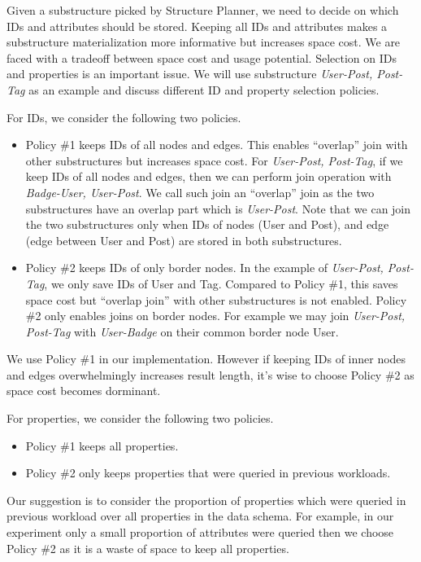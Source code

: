 Given a substructure picked by Structure Planner, we need to decide on which IDs and attributes should be stored. Keeping all IDs and attributes makes a substructure materialization more informative but increases space cost. We are faced with a tradeoff between space cost and usage potential. Selection on IDs and properties is an important issue. We will use substructure \textit{User-Post, Post-Tag} as an example and discuss different ID and property selection policies.

For IDs, we consider the following two policies.

\begin{itemize}
	\item Policy \#1 keeps IDs of all nodes and edges. This enables ``overlap'' join with  other substructures but increases space cost. For \textit{User-Post, Post-Tag}, if we keep IDs of all nodes and edges, then we can perform join operation with \textit{Badge-User, User-Post}. We call such join an ``overlap'' join as the two substructures have an overlap part which is \textit{User-Post}. Note that we can join the two substructures only when IDs of nodes (User and Post), and edge (edge between User and Post) are stored in both substructures.
	
	\item Policy \#2 keeps IDs of only border nodes. In the example of \textit{User-Post, Post-Tag}, we only save IDs of User and Tag. Compared to Policy \#1, this saves space cost but ``overlap join'' with other substructures is not enabled. Policy \#2 only enables joins on border nodes. For example we may join \textit{User-Post, Post-Tag} with \textit{User-Badge} on their common border node User.
 
	
\end{itemize}


We use Policy \#1 in our implementation. However if keeping IDs of inner nodes and edges overwhelmingly increases result length, it's wise to choose Policy \#2 as space cost becomes dorminant. 

For properties, we consider the following two policies.

\begin{itemize}
	\item Policy \#1 keeps all properties.
	\item Policy \#2 only keeps properties that were queried in previous workloads.
	
\end{itemize}
 
Our suggestion is to consider the proportion of properties which were queried in previous workload over all properties in the data schema. For example, in our experiment only a small proportion of attributes were queried then we choose Policy \#2 as it is a waste of space to keep all properties.


